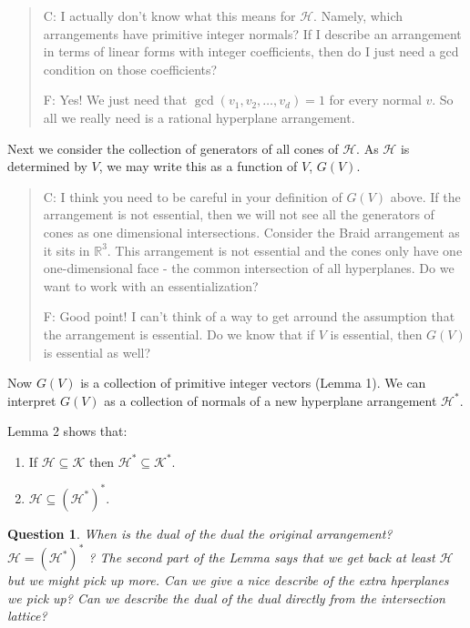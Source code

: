 \documentclass[11pt,letter]{amsart}
\newtheorem{question}[definition]{Question}
\begin{document}
\begin{quote}
C: I actually don't know what this means for $\mathcal{H}$.  Namely,
which arrangements have primitive integer normals?  If I describe an
arrangement in terms of linear forms with integer coefficients, then
do I just need a gcd condition on those coefficients?

F: Yes! We just need that $\gcd(v_1,v_2,\ldots,v_d)=1$ for every normal $v$. So all we really need is a rational hyperplane arrangement.
\end{quote}

Next we consider the collection of generators of all cones of
$\mathcal{H}$.  As $\mathcal{H}$ is determined by $V$, we may write
this as a function of $V$, $G(V)$.  

\begin{quote}
C: I think you need to be careful in your definition of $G(V)$ above.
If the arrangement is not essential, then we will not see all the
generators of cones as one dimensional intersections.  Consider the
Braid arrangement as it sits in $\mathbb{R}^3$.  This arrangement is
not essential and the cones only have one one-dimensional face - the
common intersection of all hyperplanes.  Do we want to work with an
essentialization?

F: Good point! I can't think of a way to get arround the assumption that the arrangement is essential. Do we know that if $V$ is essential, then $G(V)$ is essential as well?
\end{quote}

Now $G(V)$ is a collection of primitive integer vectors (Lemma 1).  We
can interpret $G(V)$ as a collection of normals of a new hyperplane
arrangement $\mathcal{H}^*$.

Lemma 2 shows that:
\begin{enumerate}
\item If $\mathcal{H} \subseteq \mathcal{K}$ then $\mathcal{H}^* \subseteq \mathcal{K}^*$.
\item $\mathcal{H} \subseteq (\mathcal{H}^*)^*$.
\end{enumerate}

\begin{question}
When is the dual of the dual the original arrangement?  $\mathcal{H} =
(\mathcal{H}^*)^*$ ?  The second part of the Lemma says that we get
back at least $\mathcal{H}$ but we might pick up more.  Can we give a
nice describe of the extra hperplanes we pick up?  Can we describe the
dual of the dual directly from the intersection lattice?
\end{question}
\end{document}
